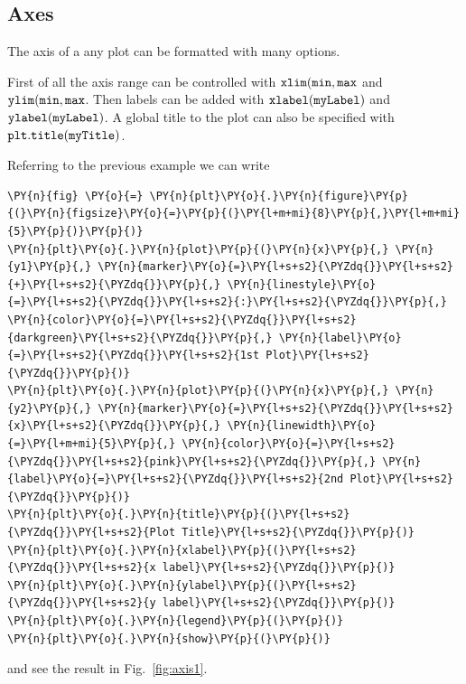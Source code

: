 \subsection{Axes}\label{axes}

The axis of a any plot can be formatted with many options.

First of all the axis range can be controlled with
\(\tt{xlim(min, max}\) and \(\tt{ylim(min, max}\). Then labels can be
added with \(\tt{xlabel(myLabel)}\) and \(\tt{ylabel(myLabel)}\). A
global title to the plot can also be specified with
\(\tt{plt.title(myTitle)}\).

Referring to the previous example we can write

\begin{tcolorbox}[breakable, size=fbox, boxrule=1pt, pad at break*=1mm,colback=cellbackground, colframe=cellborder]
\begin{Verbatim}[commandchars=\\\{\}]
\PY{n}{fig} \PY{o}{=} \PY{n}{plt}\PY{o}{.}\PY{n}{figure}\PY{p}{(}\PY{n}{figsize}\PY{o}{=}\PY{p}{(}\PY{l+m+mi}{8}\PY{p}{,}\PY{l+m+mi}{5}\PY{p}{)}\PY{p}{)}
\PY{n}{plt}\PY{o}{.}\PY{n}{plot}\PY{p}{(}\PY{n}{x}\PY{p}{,} \PY{n}{y1}\PY{p}{,} \PY{n}{marker}\PY{o}{=}\PY{l+s+s2}{\PYZdq{}}\PY{l+s+s2}{+}\PY{l+s+s2}{\PYZdq{}}\PY{p}{,} \PY{n}{linestyle}\PY{o}{=}\PY{l+s+s2}{\PYZdq{}}\PY{l+s+s2}{:}\PY{l+s+s2}{\PYZdq{}}\PY{p}{,} \PY{n}{color}\PY{o}{=}\PY{l+s+s2}{\PYZdq{}}\PY{l+s+s2}{darkgreen}\PY{l+s+s2}{\PYZdq{}}\PY{p}{,} \PY{n}{label}\PY{o}{=}\PY{l+s+s2}{\PYZdq{}}\PY{l+s+s2}{1st Plot}\PY{l+s+s2}{\PYZdq{}}\PY{p}{)}
\PY{n}{plt}\PY{o}{.}\PY{n}{plot}\PY{p}{(}\PY{n}{x}\PY{p}{,} \PY{n}{y2}\PY{p}{,} \PY{n}{marker}\PY{o}{=}\PY{l+s+s2}{\PYZdq{}}\PY{l+s+s2}{x}\PY{l+s+s2}{\PYZdq{}}\PY{p}{,} \PY{n}{linewidth}\PY{o}{=}\PY{l+m+mi}{5}\PY{p}{,} \PY{n}{color}\PY{o}{=}\PY{l+s+s2}{\PYZdq{}}\PY{l+s+s2}{pink}\PY{l+s+s2}{\PYZdq{}}\PY{p}{,} \PY{n}{label}\PY{o}{=}\PY{l+s+s2}{\PYZdq{}}\PY{l+s+s2}{2nd Plot}\PY{l+s+s2}{\PYZdq{}}\PY{p}{)}
\PY{n}{plt}\PY{o}{.}\PY{n}{title}\PY{p}{(}\PY{l+s+s2}{\PYZdq{}}\PY{l+s+s2}{Plot Title}\PY{l+s+s2}{\PYZdq{}}\PY{p}{)}
\PY{n}{plt}\PY{o}{.}\PY{n}{xlabel}\PY{p}{(}\PY{l+s+s2}{\PYZdq{}}\PY{l+s+s2}{x label}\PY{l+s+s2}{\PYZdq{}}\PY{p}{)}
\PY{n}{plt}\PY{o}{.}\PY{n}{ylabel}\PY{p}{(}\PY{l+s+s2}{\PYZdq{}}\PY{l+s+s2}{y label}\PY{l+s+s2}{\PYZdq{}}\PY{p}{)}
\PY{n}{plt}\PY{o}{.}\PY{n}{legend}\PY{p}{(}\PY{p}{)}
\PY{n}{plt}\PY{o}{.}\PY{n}{show}\PY{p}{(}\PY{p}{)}
\end{Verbatim}
\end{tcolorbox}
\noindent
and see the result in Fig.~\ref{fig:axis1}.


